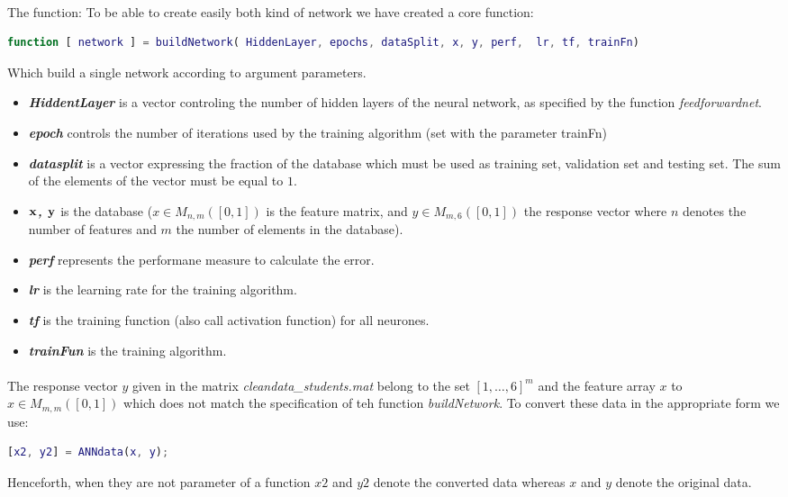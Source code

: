\documentclass[a4paper,12pt,oneside,final]{report}
\newenvironment{changemargin}[2]{\begin{list}{}{%
\setlength{\topsep}{0pt}%
\setlength{\leftmargin}{0pt}%
\setlength{\rightmargin}{0pt}%
\setlength{\listparindent}{\parindent}%
\setlength{\itemindent}{\parindent}%
\setlength{\parsep}{0pt plus 1pt}%
\addtolength{\leftmargin}{#1}%
\addtolength{\rightmargin}{#2}%
}\item }{\end{list}}
\begin{document}
\paragraph{} The function:
To be able to create easily both kind of network we have created a core function:
\begin{changemargin}{-5mm}{-5mm}
\begin{lstlisting}[language=Matlab, frame=single]
function [ network ] = buildNetwork( HiddenLayer, epochs, dataSplit, x, y, perf,  lr, tf, trainFn)
\end{lstlisting}
\end{changemargin}
Which build a single network according to argument parameters. 
\label{ch:build}
\begin{itemize}
\item {\bf \textit{HiddentLayer} } is a vector controling the number of hidden layers of the neural network, as specified by the function \textit{feedforwardnet}.
\item {\bf \textit{epoch} } controls the number of iterations used by the training algorithm (set with the parameter trainFn) 
\item {\bf \textit{datasplit} } is a vector expressing the fraction of the database which must be used as training set, validation set and testing set. The sum of the elements of the vector must be equal to $1$.
\item {\bf \textit{$\bf x$, $\bf y$} } is the database ($x\in M_{n,m}([0,1])$ is the feature matrix, and $y\in M_{m,6}([0,1])$ the response vector where $n$ denotes the number of features and $m$ the number of elements in the database).
\item {\bf \textit{perf} } represents the performane measure to calculate the error.
\item {\bf \textit{lr} } is the learning rate for the training algorithm.
\item {\bf \textit{tf} } is the training function (also call activation function) for all neurones.
\item {\bf \textit{trainFun} } is the training algorithm.
\end{itemize}
\paragraph{}
The response vector $y$ given in the matrix \textit{cleandata\_students.mat} belong to the set $[1,\hdots,6]^m$ and the feature array $x$ to $x\in M_{m,m}([0,1])$ which does not match the specification of teh function \textit{buildNetwork}. To convert these data in the appropriate form we use:
\begin{changemargin}{-5mm}{-5mm}
\begin{lstlisting}[language=Matlab, frame=single]
[x2, y2] = ANNdata(x, y);
\end{lstlisting}
\end{changemargin}
Henceforth, when they are not parameter of a function $x2$ and $y2$ denote the converted data whereas $x$ and $y$ denote the original data.
\end{document}
